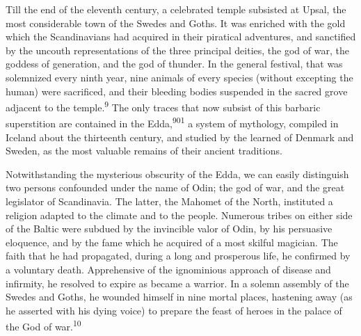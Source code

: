 


Till the end of the eleventh century, a celebrated temple
subsisted at Upsal, the most considerable town of the Swedes and
Goths. It was enriched with the gold which the Scandinavians had
acquired in their piratical adventures, and sanctified by the
uncouth representations of the three principal deities, the god
of war, the goddess of generation, and the god of thunder. In the
general festival, that was solemnized every ninth year, nine
animals of every species (without excepting the human) were
sacrificed, and their bleeding bodies suspended in the sacred
grove adjacent to the temple.\textsuperscript{9} The only traces that now subsist
of this barbaric superstition are contained in the Edda,\textsuperscript{901} a
system of mythology, compiled in Iceland about the thirteenth
century, and studied by the learned of Denmark and Sweden, as the
most valuable remains of their ancient traditions.



Notwithstanding the mysterious obscurity of the Edda, we can
easily distinguish two persons confounded under the name of Odin;
the god of war, and the great legislator of Scandinavia. The
latter, the Mahomet of the North, instituted a religion adapted
to the climate and to the people. Numerous tribes on either side
of the Baltic were subdued by the invincible valor of Odin, by
his persuasive eloquence, and by the fame which he acquired of a
most skilful magician. The faith that he had propagated, during a
long and prosperous life, he confirmed by a voluntary death.
Apprehensive of the ignominious approach of disease and
infirmity, he resolved to expire as became a warrior. In a solemn
assembly of the Swedes and Goths, he wounded himself in nine
mortal places, hastening away (as he asserted with his dying
voice) to prepare the feast of heroes in the palace of the God of
war.\textsuperscript{10}

